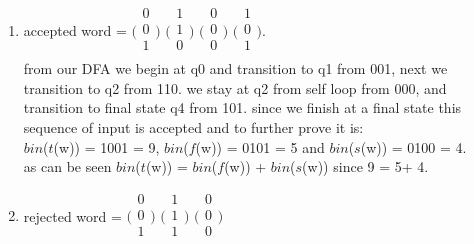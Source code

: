 \documentclass{article}
\begin{document}
\begin{enumerate}[1.]
    \item accepted word =
    $\bigl(\begin{smallmatrix}0\\0\\1\\ \end{smallmatrix}\bigr)$
    $\bigl(\begin{smallmatrix}1\\1\\0\\ \end{smallmatrix}\bigr)$
    $\bigl(\begin{smallmatrix}0\\0\\0\\ \end{smallmatrix}\bigr)$
    $\bigl(\begin{smallmatrix}1\\0\\1\\ \end{smallmatrix}\bigr)$.\\
    from our DFA we begin at q0 and transition to q1 from 001, next we transition to q2 from 110. we stay at q2 from self loop from 000, and transition to final state q4 from 101. since we finish at a final state this sequence of input is accepted and to further prove it is:\\
    $bin$($t$(w)) = 1001 = 9, 
    $bin$($f$(w)) = 0101 = 5 and
    $bin$($s$(w)) = 0100 = 4.\\
    as can be seen $bin$($t$(w)) = $bin$($f$(w)) + $bin$($s$(w)) since 9 = 5+ 4.\\
    \item rejected word =     $\bigl(\begin{smallmatrix}0\\0\\1\\ \end{smallmatrix}\bigr)$
    $\bigl(\begin{smallmatrix}1\\1\\1\\ \end{smallmatrix}\bigr)$
    $\bigl(\begin{smallmatrix}0\\0\\0\\ \end{smallmatrix}\bigr)$

\end{enumerate}
\end{document}
